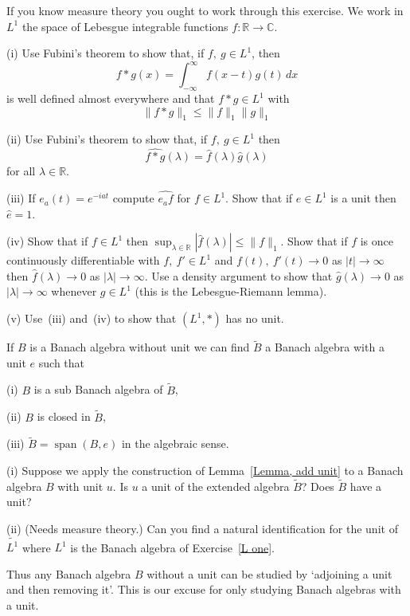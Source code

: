 \begin{exercise}\label{L one} 
If you know measure theory you ought
to work through this exercise. We work in $L^{1}$
the space of Lebesgue integrable functions 
$f:{\mathbb R}\rightarrow{\mathbb C}$.

(i) Use Fubini's theorem to show that, if $f,\ g\in L^{1}$,
then
\[f*g(x)=\int_{-\infty}^{\infty}f(x-t)g(t)\,dx\]
is well defined almost everywhere and that 
$f*g\in L^{1}$ with
\[\|f*g\|_{1}\leq \|f\|_{1}\|g\|_{1}\]

(ii) Use Fubini's theorem to show that, if $f,\ g\in L^{1}$
then
\[\widehat{f*g}(\lambda)=\hat{f}(\lambda)\hat{g}(\lambda)\]
for all $\lambda\in{\mathbb R}$.

(iii) If $e_{a}(t)=e^{-iat}$ compute $\hat{e_{a}f}$
for $f\in L^{1}$. Show that if $e\in L^{1}$ is a unit then
$\hat{e}=1$.

(iv) Show that if $f\in L^{1}$ then 
$\sup_{\lambda\in{\mathbb R}}|\hat{f}(\lambda)|\leq \|f\|_{1}$.
Show that if $f$ is once continuously differentiable with
$f,\ f'\in L^{1}$ and $f(t),\ f'(t)\rightarrow 0$ 
as $|t|\rightarrow \infty$ then $\hat{f}(\lambda)\rightarrow 0$
as $|\lambda|\rightarrow\infty$. Use a density argument
to show that $\hat{g}(\lambda)\rightarrow 0$
as $|\lambda|\rightarrow\infty$ whenever $g\in L^{1}$
(this is the Lebesgue-Riemann lemma).

(v) Use~(iii) and~(iv) to show that $(L^{1},*)$ 
has no unit.
\end{exercise}
\begin{lemma}\label{Lemma, add unit} 
If $B$ is a Banach algebra without unit
we can find $\tilde{B}$ a Banach algebra with a unit $e$
such that

(i) $B$ is a sub Banach algebra of $\tilde{B}$,

(ii) $B$ is closed in $\tilde{B}$,

(iii) $\tilde{B}=\operatorname{span}(B,e)$ in the
algebraic sense.
\end{lemma}
\begin{exercise} (i) Suppose we apply the construction 
of Lemma~\ref{Lemma, add unit} to a Banach algebra $B$
with unit $u$. Is $u$ a unit of the extended algebra
$\tilde{B}$? Does $\tilde{B}$ have a unit? 

(ii) (Needs measure theory.) Can you find a natural
identification for the unit of $\widetilde{L^{1}}$
where $L^{1}$ is the Banach algebra of Exercise~\ref{L one}.
\end{exercise}
Thus any Banach algebra $B$ without a unit
can be studied by `adjoining
a unit and then removing it'. This is our excuse
for only studying Banach algebras with a unit. 

